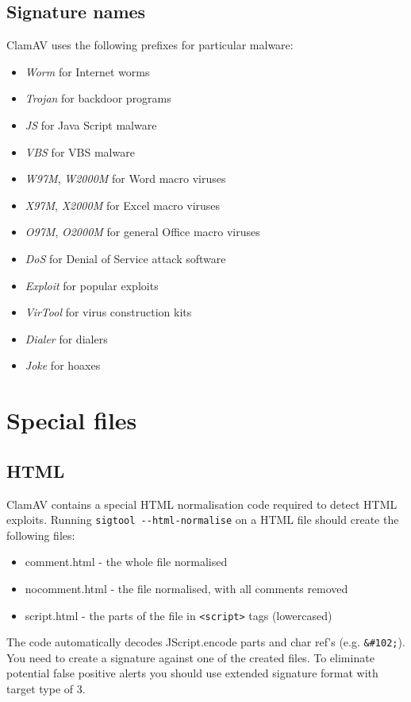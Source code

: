 \documentclass[a4paper,titlepage,12pt]{article}
\begin{document}
    \subsection{Signature names}
    ClamAV uses the following prefixes for particular malware:
    \begin{itemize}
	\item \emph{Worm} for Internet worms
	\item \emph{Trojan} for backdoor programs
	\item \emph{JS} for Java Script malware
	\item \emph{VBS} for VBS malware
	\item \emph{W97M}, \emph{W2000M} for Word macro viruses
	\item \emph{X97M}, \emph{X2000M} for Excel macro viruses
	\item \emph{O97M}, \emph{O2000M} for general Office macro viruses
	\item \emph{DoS} for Denial of Service attack software
	\item \emph{Exploit} for popular exploits
	\item \emph{VirTool} for virus construction kits
	\item \emph{Dialer} for dialers
	\item \emph{Joke} for hoaxes
    \end{itemize}

    \section{Special files}

    \subsection{HTML}
    ClamAV contains a special HTML normalisation code required to detect
    HTML exploits. Running \verb+sigtool --html-normalise+ on a HTML file
    should create the following files:
    \begin{itemize}
	\item comment.html - the whole file normalised
	\item nocomment.html - the file normalised, with all comments removed
	\item script.html - the parts of the file in \verb+<script>+ tags
	      (lowercased)
    \end{itemize}
    The code automatically decodes JScript.encode parts and char ref's (e.g.
    \verb+&#102;+). You need to create a signature against one of the created
    files. To eliminate potential false positive alerts you should use
    extended signature format with target type of 3.
\end{document}
